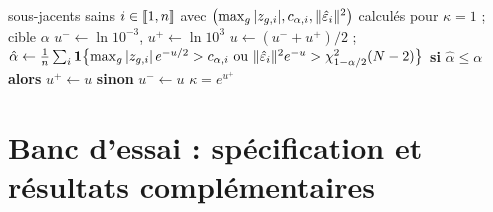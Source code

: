 \begin{algorithm}[H]
\caption{Calibration de l'échelle $\kappa$}\label{alg-kappa}
\begin{algorithmic}[1]
\Require sous-jacents sains $i\in\llbracket 1, n\rrbracket$ avec $\bigl(\max_g|z_{g,i}|, c_{\alpha,i}, \lVert \hat\varepsilon_i\rVert^2\bigr)$ calculés pour
$\kappa=1$ ; cible $\alpha$
\State $u^-\gets\ln10^{-3}$, $u^+\gets\ln10^{3}$
  \State $u\gets(u^-+u^+)/2$ ; $\hat\alpha\gets\frac1n\sum_i\one\bigl\{\max_g|z_{g,i}|\,e^{-u/2}>c_{\alpha,i}\ \text{ou}\
  \norm{\eh_i}^2e^{-u}>\chi^2_{1-\alpha/2}(N-2)\bigr\}$
  \State \textbf{si} $\hat\alpha\le\alpha$ \textbf{alors} $u^+\gets u$ \textbf{sinon} $u^-\gets u$
\EndFor
\State \Return $\kappa=e^{u^+}$
\end{algorithmic}
\end{algorithm}

\section{Banc d'essai : spécification et résultats complémentaires}\label{app-synthetic}
